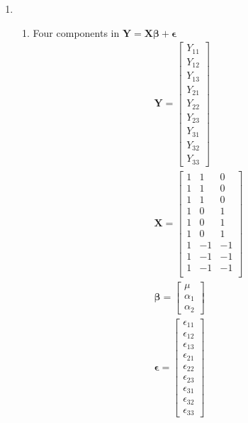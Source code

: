 \documentclass{article}
\begin{document}
\begin{enumerate}[leftmargin = 0 em, label = \arabic*., font = \bfseries]
	
	\item 
	\begin{enumerate}
		\item Four components in ${\bm Y} = \bm X \bm \beta + \bm \epsilon$
		\begin{align*}
		& \bm Y = \begin{bmatrix}
			Y_{11}\\
			Y_{12}\\
			Y_{13}\\
			Y_{21}\\
			Y_{22}\\
			Y_{23}\\
			Y_{31}\\
			Y_{32}\\
			Y_{33}
		\end{bmatrix}
		\\
		& \bm X = \begin{bmatrix}
			1&1&0\\
			1&1&0\\
			1&1&0\\
			1&0&1\\
			1&0&1\\
			1&0&1\\
			1&-1&-1\\
			1&-1&-1\\
			1&-1&-1\\
		\end{bmatrix}
		\\
		& \bm \beta = \begin{bmatrix}
			\mu\\
			\alpha_1\\
			\alpha_2
		\end{bmatrix}
		\\
		& \bm \epsilon = \begin{bmatrix}
			\epsilon_{11}\\
			\epsilon_{12}\\
			\epsilon_{13}\\
			\epsilon_{21}\\
			\epsilon_{22}\\
			\epsilon_{23}\\
			\epsilon_{31}\\
			\epsilon_{32}\\
			\epsilon_{33}
		\end{bmatrix}
		\end{align*}


\end{enumerate}
\end{enumerate}
\end{document}
